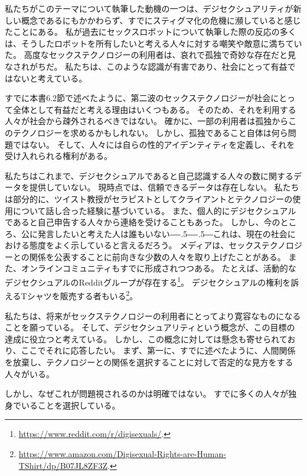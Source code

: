 \documentclass[paper=a4,book,openany]{jlreq}
\def\DDASH{―\kern-.5\zw―\kern-.5\zw―}
\begin{document}
私たちがこのテーマについて執筆した動機の一つは、デジセクシュアリティが新しい概念であるにもかかわらず、すでにスティグマ化の危機に瀕していると感じたことにある。
私が過去にセックスロボットについて執筆した際の反応の多くは、そうしたロボットを所有したいと考える人々に対する嘲笑や敵意に満ちていた。
高度なセックステクノロジーの利用者は、哀れで孤独で奇妙な存在だと見なされがちだ。
私たちは、このような認識が有害であり、社会にとって有益ではないと考えている。

すでに本書6.2節で述べたように、第二波のセックステクノロジーが社会にとって全体として有益だと考える理由はいくつもある。
そのため、それを利用する人々が社会から疎外されるべきではない。
確かに、一部の利用者は孤独からこのテクノロジーを求めるかもしれない。
しかし、孤独であること自体は何ら問題ではない。
そして、人々には自らの性的アイデンティティを定義し、それを受け入れられる権利がある。

私たちはこれまで、デジセクシュアルであると自己認識する人々の数に関するデータを提供していない。
現時点では、信頼できるデータは存在しない。
私たちは部分的に、ツイスト教授がセラピストとしてクライアントとテクノロジーの使用について話し合った経験に基づいている。
また、個人的にデジセクシュアルであると自己申告する人々から連絡を受けることもあった。
しかし、今のところ、公に発言したいと考えた人は誰もいない{\DDASH}これは、現在の社会における態度をよく示していると言えるだろう。
メディアは、セックステクノロジーとの関係を公表することに前向きな少数の人々を取り上げたことがある\citep{haas17:_chines_man_marries_robot_he_built_himsel,jozuka18:_beyon_dimen,weiss19:_these_men_love_their_sex}。
また、オンラインコミュニティもすでに形成されつつある。
たとえば、活動的なデジセクシュアルのRedditグループが存在する\footnote{\url{https://www.reddit.com/r/digisexuals/}.}。
デジセクシュアルの権利を訴えるTシャツを販売する者もいる\footnote{\url{https://www.amazon.com/Digisexual-Rights-are-Human-TShirt/dp/B07JL8ZF3Z}.}。

私たちは、将来がセックステクノロジーの利用者にとってより寛容なものになることを願っている。
そして、デジセクシュアリティという概念が、この目標の達成に役立つと考えている。
しかし、この概念に対しては懸念も寄せられており、ここでそれに応答したい。
まず、第一に、すでに述べたように、人間関係を放棄し、テクノロジーとの関係を選択することに対して否定的な見方をする人々がいる。

しかし、なぜこれが問題視されるのかは明確ではない。
すでに多くの人々が独身でいることを選択している\citep{depaulo17:_how_many_americ_want_be_singl}。
\end{document}
